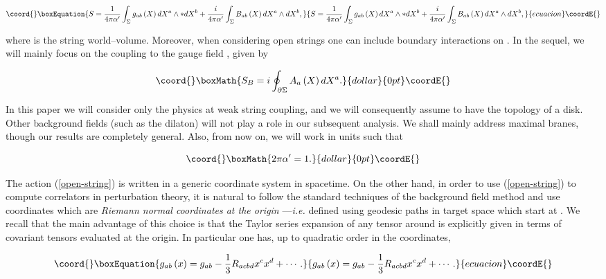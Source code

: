 \documentclass[a4paper,11pt]{article}
\begin{document}
\begin{equation}\coord{}\boxEquation{
S=\frac{1}{4\pi \alpha ^{\prime }}\int_{\Sigma }g_{ab}\left( X\right)
dX^{a}\wedge \ast dX^{b}+\frac{i}{4\pi \alpha ^{\prime }}\int_{\Sigma
}B_{ab}\left( X\right) dX^{a}\wedge dX^{b},  \label{open-string}
}{
S=\frac{1}{4\pi \alpha ^{\prime }}\int_{\Sigma }g_{ab}\left( X\right)
dX^{a}\wedge \ast dX^{b}+\frac{i}{4\pi \alpha ^{\prime }}\int_{\Sigma
}B_{ab}\left( X\right) dX^{a}\wedge dX^{b},  }{ecuacion}\coordE{}\end{equation}

\noindent
where \myHighlight{$\Sigma$}\coordHE{} is the string world--volume. Moreover, when 
considering open strings one can include boundary interactions on \myHighlight{$\partial 
\Sigma$}\coordHE{}. In the sequel, we will mainly focus on the coupling to the \coordHE{} gauge field \coordHE{}, given by 

$$\coord{}\boxMath{
S_{B}=i\oint_{\partial \Sigma }A_{a}\left( X\right) dX^{a}.
}{dollar}{0pt}\coordE{}$$

\noindent
In this paper we will consider only the physics at weak string coupling, and 
we will consequently assume \myHighlight{$\Sigma $}\coordHE{} to have the topology of a
disk. Other background fields (such as the dilaton) will not play a 
role in our subsequent analysis. We shall mainly address maximal 
branes, though our results are completely general. Also, from now on, we will 
work in units such that

$$\coord{}\boxMath{
2\pi \alpha ^{\prime }=1.
}{dollar}{0pt}\coordE{}$$

The action (\ref{open-string}) is written in a generic coordinate system 
\coordHE{} in spacetime. On the other hand, in order to use (\ref{open-string}) 
to compute correlators in perturbation theory, it is natural to follow the
standard techniques of the background field method and use coordinates 
\coordHE{} which are \textit{Riemann normal coordinates at the origin} 
---\textit{i.e.} defined using geodesic paths in target space which start 
at \coordHE{} \cite{AFM, BCZ}. We recall that the main advantage of this 
choice is that the Taylor series expansion of any tensor around \coordHE{} 
is explicitly given in terms of covariant tensors evaluated at the origin. 
In particular one has, up to quadratic order in the coordinates, 

\begin{equation}\coord{}\boxEquation{
g_{ab}\left( x\right) =g_{ab}-\frac{1}{3}R_{acbd}x^{c}x^{d}+\cdots .
\label{metricEx}
}{
g_{ab}\left( x\right) =g_{ab}-\frac{1}{3}R_{acbd}x^{c}x^{d}+\cdots .
}{ecuacion}\coordE{}\end{equation}
\end{document}
